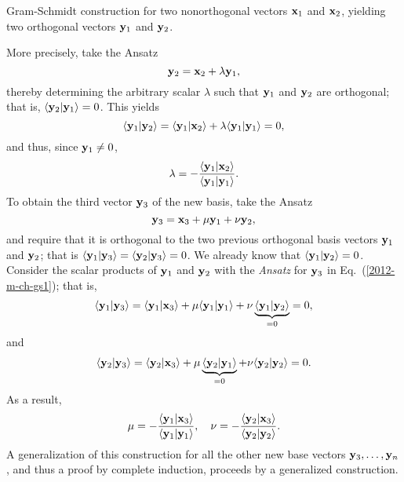 {\begin{marginfigure}
{\begin{center}
\begin{tikzpicture}[ scale=0.6]
\end{tikzpicture}
\end{center}%
\caption{Gram-Schmidt construction for two nonorthogonal vectors ${\bf x}_1$ and ${\bf x}_2$,
yielding two  orthogonal vectors ${\bf y}_1$ and ${\bf y}_2$.}
}
  \label{2012-m-fdvs-ideaofGS}
\end{marginfigure}
More precisely, take the Ansatz
\begin{equation}
{\bf y}_2={\bf x}_2 + \lambda  {\bf y}_1,
\end{equation}
thereby determining the arbitrary scalar $\lambda$ such that
${\bf y}_1$
and
${\bf y}_2$
are orthogonal; that is,
$\langle{\bf y}_2 \vert  {\bf y}_1\rangle =0$.
This yields
\begin{equation}
\langle {\bf y}_1\vert  {\bf y}_2 \rangle
=\langle {\bf y}_1 \vert {\bf x}_2 \rangle
+ \lambda
\langle {\bf y}_1\vert  {\bf y}_1\rangle =0,
\end{equation}
and thus, since ${\bf y}_1 \neq 0$,
\begin{equation}
\lambda =
-
\frac{\langle {\bf y}_1 \vert {\bf x}_2 \rangle}
{\langle {\bf y}_1\vert {\bf y}_1 \rangle} .
\end{equation}
To obtain the third vector ${\bf y}_3$ of the new basis,
take the Ansatz
\begin{equation}
{\bf y}_3={\bf x}_3 + \mu  {\bf y}_1  + \nu  {\bf y}_2,
\label{2012-m-ch-gs1}
\end{equation}
and require that it is orthogonal to the two previous orthogonal basis vectors
${\bf y}_1$
and
${\bf y}_2$;
that is
$\langle {\bf y}_1\vert {\bf y}_3 \rangle =\langle  {\bf y}_2\vert{\bf y}_3  \rangle =0$.
We already know that $\langle {\bf y}_1\vert {\bf y}_2 \rangle = 0$.
Consider the scalar products of ${\bf y}_1$
and ${\bf y}_2$
with the {\it Ansatz} for ${\bf y}_3$ in Eq.~(\ref{2012-m-ch-gs1}); that is,
\begin{equation}
\begin{split}
\langle {\bf y}_1\vert {\bf y}_3\rangle
=
\langle {\bf y}_1 \vert {\bf x}_3 \rangle + \mu  \langle {\bf y}_1\vert {\bf y}_1 \rangle  + \nu   \underbrace{\langle {\bf y}_1\vert {\bf y}_2\rangle}_{=0}
 =0,
\end{split}
\end{equation}
and
\begin{equation}
\begin{split}
\langle{\bf y}_2 \vert {\bf y}_3\rangle =\langle {\bf y}_2\vert  {\bf x}_3\rangle + \mu \underbrace{ \langle {\bf y}_2\vert {\bf y}_1 \rangle}_{=0}   + \nu \langle {\bf y}_2\vert {\bf y}_2\rangle
  =0.
\end{split}
\end{equation}
As a result,
\begin{equation}
\mu = -  \frac{\langle {\bf y}_1 \vert {\bf x}_3 \rangle}
{\langle {\bf y}_1\vert {\bf y}_1 \rangle},\quad
\nu =- \frac{\langle {\bf y}_2\vert  {\bf x}_3\rangle}
{\langle {\bf y}_2 \vert {\bf y}_2 \rangle}.
\end{equation}
A generalization of this construction
for all the other new base vectors
${\bf y}_3, \ldots ,  {\bf y}_n$, and thus a proof by complete induction,
proceeds by a generalized construction.
\eproof
}

